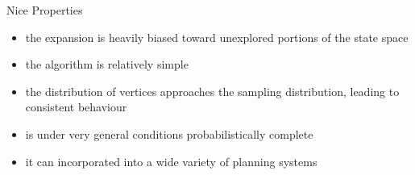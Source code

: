 \documentclass[%
  professionalfonts,%
  xcolor={%
    usenames,%
    dvipsnames,%
    svgnames,%
    table,%
    hyperref%
  }%
]{beamer}
\begin{document}
      \begin{frame}{Nice Properties}
        \begin{itemize}
          \item the expansion is heavily biased toward unexplored portions of the state space
          \item the algorithm is relatively simple
          \item the distribution of vertices approaches the sampling distribution, leading to consistent behaviour
          \item is under very general conditions probabilistically complete 
          \item it can incorporated into a wide variety of planning systems
        \end{itemize}
      \end{frame}
      
      
\end{document}
